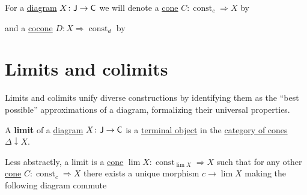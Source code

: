 \documentclass[../../main]{subfiles}
\begin{document}
\begin{notation}
  For a \hyperref[def:diagram]{diagram} \(X\colon \mathsf{J} \to \mathsf{C}\) we will denote a \hyperref[def:cone]{cone} \(C\colon \operatorname{const}_{c} \Rightarrow X\) by
  \begin{center}
  \end{center}
  and a \hyperref[def:cocone]{cocone} \(D\colon X \Rightarrow \operatorname{const}_{d}\) by
  \begin{center}
  \end{center}
\end{notation}


\section{Limits and colimits}

Limits and colimits unify diverse constructions by identifying them as the ``best possible'' approximations of a diagram, formalizing their universal properties.

\begin{definition}[Limit]\label{def:categorical-limit}
  A \textbf{limit} of a \hyperref[def:diagram]{diagram} \(X\colon \mathsf{J} \to \mathsf{C}\) is a \hyperref[def:initial-terminal-object]{terminal object} in the \hyperref[def:cone]{category of cones} \(\Delta \downarrow X\).

  Less abstractly, a limit is a \hyperref[def:cone]{cone} \(\lim X\colon \operatorname{const}_{\lim X} \Rightarrow X\) such that for any other \hyperref[def:cone]{cone} \(C\colon \operatorname{const}_{c} \Rightarrow X\) there exists a unique morphism \(c \to \lim X\) making the following diagram commute
  \begin{center}
  \end{center}
\end{definition}
\end{document}
